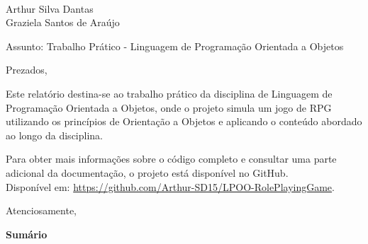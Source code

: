 \documentclass[11pt]{uiobrev}
\date{17 de Novembro de 2024}
\begin{document}
\begin{letter}{\\Arthur Silva Dantas \\ Graziela Santos de Araújo}

    \opening{Assunto: Trabalho Prático - Linguagem de Programação Orientada a Objetos}

    Prezados,

    Este relatório destina-se ao trabalho prático da disciplina de Linguagem de Programação Orientada a Objetos, onde o projeto simula um jogo de RPG utilizando os princípios de Orientação a Objetos e aplicando o conteúdo abordado ao longo da disciplina.

    \bigskip
    Para obter mais informações sobre o código completo e consultar uma parte adicional da documentação, o projeto está disponível no GitHub. 
    \\ Disponível em: \url{https://github.com/Arthur-SD15/LPOO-RolePlayingGame}.

    \closing{Atenciosamente,}
\thispagestyle{empty} 
\end{letter}

\newpage

\begin{center}
    \Large \textbf{Sumário}
\end{center}
\vspace{1cm}
\end{document}
